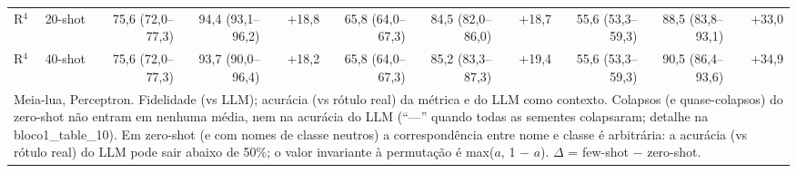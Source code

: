 \begin{table}[htbp]
\begin{tabular}{llrrrrrrrrr}
R$^4$ & 20-shot & 75,6 (72,0–77,3) & 94,4 (93,1–96,2) & +18,8 & 65,8 (64,0–67,3) & 84,5 (82,0–86,0) & +18,7 & 55,6 (53,3–59,3) & 88,5 (83,8–93,1) & +33,0 \\
R$^4$ & 40-shot & 75,6 (72,0–77,3) & 93,7 (90,0–96,4) & +18,2 & 65,8 (64,0–67,3) & 85,2 (83,3–87,3) & +19,4 & 55,6 (53,3–59,3) & 90,5 (86,4–93,6) & +34,9 \\
\bottomrule
\multicolumn{11}{p{0.95\linewidth}}{\footnotesize Meia-lua, Perceptron. Fidelidade (vs LLM); acurácia (vs rótulo real) da métrica e do LLM como contexto. Colapsos (e quase-colapsos) do zero-shot não entram em nenhuma média, nem na acurácia do LLM (``—'' quando todas as sementes colapsaram; detalhe na bloco1\_table\_10). Em zero-shot (e com nomes de classe neutros) a correspondência entre nome e classe é arbitrária: a acurácia (vs rótulo real) do LLM pode sair abaixo de 50\%; o valor invariante à permutação é max($a$, 1 $-$ $a$). $\Delta$ = few-shot $-$ zero-shot.} \\
\end{tabular}
\end{table}
